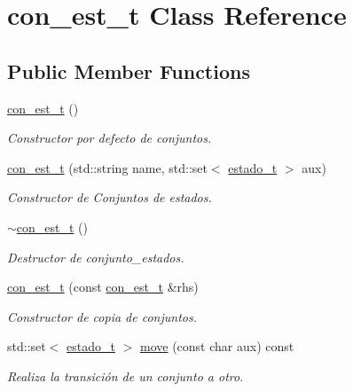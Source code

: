 \hypertarget{classcon__est__t}{}\section{con\+\_\+est\+\_\+t Class Reference}
\label{classcon__est__t}
\subsection*{Public Member Functions}
\begin{DoxyCompactItemize}
\item 
\mbox{\label{classcon__est__t_a9244ad9d8511ad6725f8a1d4a1afef04}} 
\hyperlink{classcon__est__t_a9244ad9d8511ad6725f8a1d4a1afef04}{con\+\_\+est\+\_\+t} ()
\begin{DoxyCompactList}\small\item\em Constructor por defecto de conjuntos. \end{DoxyCompactList}\item 
\hyperlink{classcon__est__t_ac3ae8315196a410571f03bc1f7ec54e3}{con\+\_\+est\+\_\+t} (std\+::string name, std\+::set$<$ \hyperlink{classestado__t}{estado\+\_\+t} $>$ aux)
\begin{DoxyCompactList}\small\item\em Constructor de Conjuntos de estados. \end{DoxyCompactList}\item 
\mbox{\label{classcon__est__t_a116245486faa814015c578a6f4f7e316}} 
\hyperlink{classcon__est__t_a116245486faa814015c578a6f4f7e316}{$\sim$con\+\_\+est\+\_\+t} ()
\begin{DoxyCompactList}\small\item\em Destructor de conjunto\+\_\+estados. \end{DoxyCompactList}\item 
\hyperlink{classcon__est__t_a55a90d1c37eae69895ee0ff02d15eec7}{con\+\_\+est\+\_\+t} (const \hyperlink{classcon__est__t}{con\+\_\+est\+\_\+t} \&rhs)
\begin{DoxyCompactList}\small\item\em Constructor de copia de conjuntos. \end{DoxyCompactList}\item 
std\+::set$<$ \hyperlink{classestado__t}{estado\+\_\+t} $>$ \hyperlink{classcon__est__t_a1da98e6185b4e249552c3611891aaefd}{move} (const char aux) const
\begin{DoxyCompactList}\small\item\em Realiza la transición de un conjunto a otro. \end{DoxyCompactList}\item 

\end{DoxyCompactItemize}
